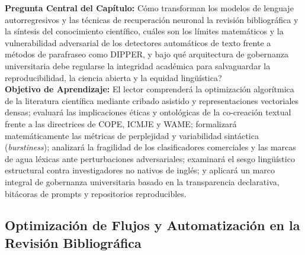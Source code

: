 \begin{cajabeige}
\textbf{Pregunta Central del Capítulo:} \textquestiondown Cómo transforman los modelos de lenguaje autorregresivos y las técnicas de recuperación neuronal la revisión bibliográfica y la síntesis del conocimiento científico, cuáles son los límites matemáticos y la vulnerabilidad adversarial de los detectores automáticos de texto frente a métodos de parafraseo como DIPPER, y bajo qué arquitectura de gobernanza universitaria debe regularse la integridad académica para salvaguardar la reproducibilidad, la ciencia abierta y la equidad lingüística?\\[0.3cm]
\textbf{Objetivo de Aprendizaje:} El lector comprenderá la optimización algorítmica de la literatura científica mediante cribado asistido y representaciones vectoriales densas; evaluará las implicaciones éticas y ontológicas de la co-creación textual frente a las directrices de COPE, ICMJE y WAME; formalizará matemáticamente las métricas de perplejidad y variabilidad sintáctica (\textit{burstiness}); analizará la fragilidad de los clasificadores comerciales y las marcas de agua léxicas ante perturbaciones adversariales; examinará el sesgo lingüístico estructural contra investigadores no nativos de inglés; y aplicará un marco integral de gobernanza universitaria basado en la transparencia declarativa, bitácoras de prompts y repositorios reproducibles.
\end{cajabeige}


\vspace{0.4cm}
\subsection{Optimización de Flujos y Automatización en la Revisión Bibliográfica}

